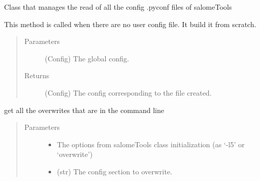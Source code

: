\documentclass[a4paper,10pt,english]{sphinxmanual}
\begin{document}
\begin{fulllineitems}
\label{\detokenize{apidoc_src/src:src.configManager.ConfigManager}}
Class that manages the read of all the config .pyconf files of salomeTools

\begin{fulllineitems}
\label{\detokenize{apidoc_src/src:src.configManager.ConfigManager.create_config_file}}
This method is called when there are no user config file. 
It build it from scratch.
\begin{quote}\begin{description}
\item[{Parameters}] \leavevmode
{} \textendash{} (Config) The global config.

\item[{Returns}] \leavevmode
(Config) 
The config corresponding to the file created.

\end{description}\end{quote}

\end{fulllineitems}


\begin{fulllineitems}
\label{\detokenize{apidoc_src/src:src.configManager.ConfigManager.get_command_line_overrides}}
get all the overwrites that are in the command line
\begin{quote}\begin{description}
\item[{Parameters}] \leavevmode\begin{itemize}
\item {} 
 \textendash{} The options from salomeTools class initialization 
(as ‘-l5’ or ‘\textendash{}overwrite’)

\item {} 
 \textendash{} (str) The config section to overwrite.


\end{itemize}
\end{description}
\end{quote}
\end{fulllineitems}
\end{fulllineitems}
\end{document}
